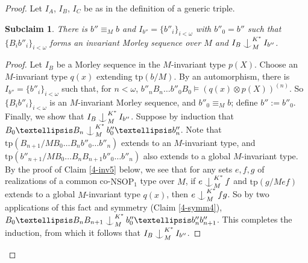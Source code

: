 \documentclass[10pt,a4paper]{amsart}
\newtheorem{subclaim}{Subclaim}
\def\Ind#1#2{#1\setbox0=\hbox{$#1x$}\kern\wd0\hbox to 0pt{\hss$#1\mid$\hss}
\lower.9\ht0\hbox to 0pt{\hss$#1\smile$\hss}\kern\wd0}
\def\ind{\mathop{\mathpalette\Ind{}}}
\begin{document}
\begin{proof}
    Let $I_{A}$, $I_{B}$, $I_{C}$ be as in the definition of a generic triple.

    \begin{subclaim}
    There is $b'' \equiv_{M} b$ and $I_{b''}=\{b''_{i}\}_{i < \omega}$ with $b''_{0} = b''$ such that $\{B_{i} b''_{i}\}_{i < \omega}$ forms an invariant Morley sequence over $M$ and $I_{B} \ind^{K^{*}}_{M} I_{b''}$.
    
    \end{subclaim}

    \begin{proof}
    Let $I_{B}$ be a Morley sequence in the $M$-invariant type $p(X)$. Choose an $M$-invariant type $q(x)$ extending $\mathrm{tp}(b/M)$. By an automorphism, there is $I_{b''}=\{b''_{i}\}_{i < \omega}$ such that, for $n < \omega$, $b''_{n}B_{n} \ldots b''_{0}B_{0}\models (q(x)\otimes p(X))^{(n)} $. So $\{B_{i} b''_{i}\}_{i < \omega}$ is an $M$-invariant Morley sequence, and $b''_{0} \equiv_{M} b$; define $b'' := b''_{0}$. Finally, we show that $I_{B} \ind^{K^{*}}_{M} I_{b''}$. Suppose by induction that $B_{0} \ldots B_{n}\ind^{K^{*}}_{M}b''_{0} \ldots b''_{n}$. Note that $\mathrm{tp}(B_{n+1}/MB_{0}\ldots B_{n} b''_{0} \ldots b''_{n})$ extends to an $M$-invariant type, and $\mathrm{tp}(b''_{n+1}/MB_{0}\ldots B_{n}B_{n+1} b''_{0} \ldots b''_{n})$ also extends to a global $M$-invariant type. By the proof of Claim \ref{4-inv5} below, we see that for any sets $e, f, g$ of realizations of a common co-$\mathrm{NSOP}_{1}$ type over $M$, if $e \ind^{K^{*}}_{M} f$ and $\mathrm{tp}(g/Mef)$ extends to a global $M$-invariant type $q(x)$, then $e \ind^{K^{*}}_{M} fg$. So by two applications of this fact and symmetry (Claim \ref{4-symm4}), $B_{0} \ldots B_{n}B_{n+1}\ind^{K^{*}}_{M}b''_{0} \ldots b''_{n}b''_{n+1}$. This completes the induction, from which it follows that $I_{B} \ind^{K^{*}}_{M} I_{b''}$.
    \end{proof}


\end{proof}
\end{document}
